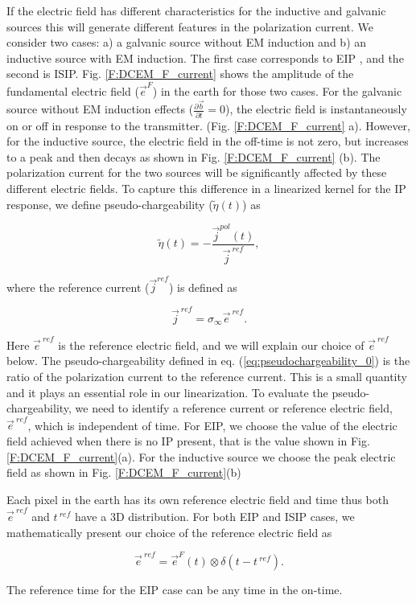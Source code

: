 \documentclass[extra,mreferee]{gji}
\newcommand{\siginf}{\sigma_\infty}
\renewcommand {\j}  { {\vec j} }
\renewcommand {\b}  { {\vec b} }
\newcommand {\e}  { {\vec e} }
\newcommand{\peta}{\tilde{\eta}}
\newcommand{\eref}{\e^{\ ref}}
\begin{document}
If the electric field has different characteristics for the inductive and galvanic sources this will generate different features in the polarization current.  
We consider two cases: a) a galvanic source without EM induction and b) an inductive source with EM induction. The first case corresponds to EIP \cite[]{seigel1959}, and the second is ISIP.
Fig. \ref{F:DCEM_F_current} shows the amplitude of the fundamental electric field ($\e^{F}$) in the earth for those two cases. 
For the galvanic source without EM induction effects ($\frac{\partial \b}{\partial t}=0$), the electric field is instantaneously on or off in response to the transmitter. (Fig. \ref{F:DCEM_F_current} a). 
However, for the inductive source, the electric field in the off-time is not zero, but increases to a peak and then decays as shown in Fig. \ref{F:DCEM_F_current} (b). 
The polarization current for the two sources will be significantly affected by these different electric fields. 
To capture this difference in a linearized kernel for the IP response, we define pseudo-chargeability ($\peta(t)$) as 
\begin{linenomath*}
\begin{equation}
  \peta(t) = -\frac{\j^{pol}(t)}{\j^{\ ref}},
  \label{eq:pseudochargeability_0}
\end{equation}
\end{linenomath*}
where the reference current ($\j^{ref}$) is defined as 
\begin{linenomath*}
\begin{equation}
  \j^{\ ref} = \siginf \eref.
  \label{eq:reference_current}
\end{equation}
\end{linenomath*}
Here $\eref$ is the reference electric field, and we will explain our choice of $\eref$ below. 
The pseudo-chargeability defined in eq. (\ref{eq:pseudochargeability_0})  is the ratio of  the polarization current to the reference current. This is a small quantity and it plays an essential role in our linearization. 
To evaluate the pseudo-chargeability, we need to identify a reference current or reference electric field, $\eref$, which is independent of time. For EIP, we choose the value of the electric field achieved when there is no IP present, that is the value shown  in Fig. \ref{F:DCEM_F_current}(a). For the inductive source  we choose the peak electric field as shown in Fig. \ref{F:DCEM_F_current}(b)

Each pixel in the earth has its own reference electric field and time thus  both $\eref$ and $t^{\ ref}$ have a 3D distribution. 
For both EIP and ISIP cases, we mathematically present our choice of the reference electric field as
\begin{linenomath*}
\begin{equation}
  \eref = \e^{F}(t) \otimes \delta(t-t^{\ ref}). 
  \label{eq:reference_electricfield}
\end{equation}
\end{linenomath*}
The reference time for the EIP case can be any time in the on-time. 
\end{document}
